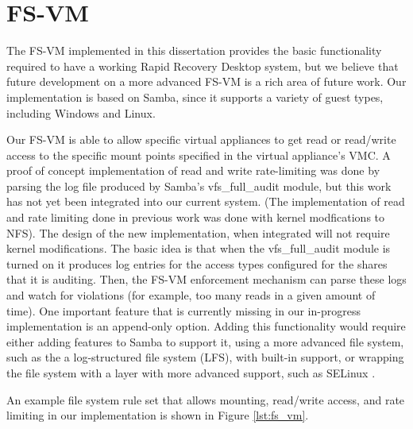 \section{FS-VM}
\label{sec:fs-vm-implementation}

The FS-VM implemented in this dissertation provides the basic functionality required to have a working Rapid Recovery Desktop system, but we believe that future development on a more advanced FS-VM is a rich area of future work. Our implementation is based on Samba, since it supports a variety of guest types, including Windows and Linux. 

Our FS-VM is able to allow specific virtual appliances to get read or read/write access to the specific mount points specified in the virtual appliance's VMC. A proof of concept implementation of read and write rate-limiting was done by parsing the log file produced by Samba's vfs\_full\_audit module, but this work has not yet been integrated into our current system. (The implementation of read and rate limiting done in previous work\cite{rapid_recovery_paper_05} was done with kernel modfications to NFS). The design of the new implementation, when integrated will not require kernel modifications. The basic idea is that when the  vfs\_full\_audit module is turned on it produces log entries for the access types configured for the shares that it is auditing. Then, the FS-VM enforcement mechanism can parse these logs and watch for violations (for example, too many reads in a given amount of time). One important feature that is currently missing in our in-progress implementation is an append-only option. Adding this functionality would require either adding features to Samba to support it, using a more advanced file system, such as the a log-structured file system (LFS)\cite{rosenblum_lfs_1992 }, with built-in support, or wrapping the file system with a layer with more advanced support, such as SELinux \cite{smalley_2001}.

An example file system rule set that allows mounting, read/write access, and rate limiting in our implementation is shown in Figure \ref{lst:fs_vm}.

